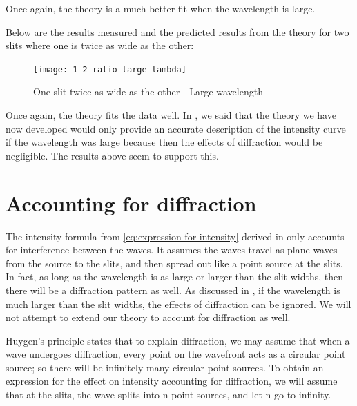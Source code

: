 \documentclass{paper}
\begin{document}
Once again, the theory is a much better fit when the wavelength is
large.

Below are the results measured and the predicted results from the theory
for two slits where one is twice as wide as the other:

\begin{figure}[H]
\label{fig:1-2-ratio-large-lambda}
\caption{One slit twice as wide as the other - Large wavelength}
    \texttt{[image: 1-2-ratio-large-lambda]}
\end{figure}

Once again, the theory fits the data well.
In , we said that the theory we have now developed
would only provide an accurate description of the intensity curve if the wavelength was large because
then the effects of diffraction would be negligible.
The results above seem to support this.

\section{Accounting for diffraction}
\label{section:accounting-for-diffraction}

The intensity formula from \eqref{eq:expression-for-intensity} derived in  only accounts for interference between the waves. It assumes the waves travel as plane waves from the source to the slits, and then spread out like a point source at the slits. In fact, as long as the wavelength is as large or larger than the slit widths, then there will be a diffraction pattern as well. As discussed in , if the wavelength is much larger than the slit widths, the effects of diffraction can be ignored. We will not attempt to extend our theory to account for diffraction as well.

Huygen’s principle \parencite{huygens-principle} states that to explain diffraction, we may assume that when a wave undergoes diffraction, every point on the wavefront
acts as a circular point source; so there will be infinitely many circular point
sources. To obtain an expression for the effect on intensity accounting for diffraction, we will assume that at the slits, the wave splits into n point sources, and let n go
to infinity.
\end{document}
